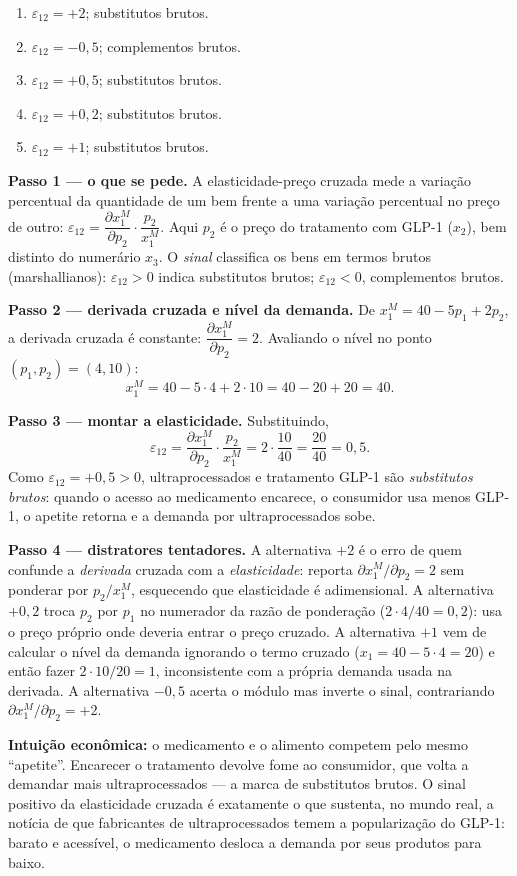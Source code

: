 \begin{enumerate}[label=\Alph*., leftmargin=3.2em, itemsep=0.15em, topsep=0.2em]
  \item $\varepsilon_{12}=+2$; substitutos brutos.
  \item $\varepsilon_{12}=-0{,}5$; complementos brutos.
  \item $\varepsilon_{12}=+0{,}5$; substitutos brutos.
  \item $\varepsilon_{12}=+0{,}2$; substitutos brutos.
  \item $\varepsilon_{12}=+1$; substitutos brutos.
\end{enumerate}
\begin{solucao}
\textbf{Passo 1 --- o que se pede.} A elasticidade-preço cruzada mede a variação percentual da quantidade de um bem frente a uma variação percentual no preço de outro: $\varepsilon_{12}=\dfrac{\partial x_1^{M}}{\partial p_2}\cdot\dfrac{p_2}{x_1^{M}}$. Aqui $p_2$ é o preço do tratamento com GLP-1 ($x_2$), bem distinto do numerário $x_3$. O \emph{sinal} classifica os bens em termos brutos (marshallianos): $\varepsilon_{12}>0$ indica substitutos brutos; $\varepsilon_{12}<0$, complementos brutos.

\textbf{Passo 2 --- derivada cruzada e nível da demanda.} De $x_1^{M}=40-5p_1+2p_2$, a derivada cruzada é constante: $\dfrac{\partial x_1^{M}}{\partial p_2}=2$. Avaliando o nível no ponto $(p_1,p_2)=(4,10)$:
\[
x_1^{M}=40-5\cdot 4+2\cdot 10=40-20+20=40.
\]

\textbf{Passo 3 --- montar a elasticidade.} Substituindo,
\[
\varepsilon_{12}=\frac{\partial x_1^{M}}{\partial p_2}\cdot\frac{p_2}{x_1^{M}}=2\cdot\frac{10}{40}=\frac{20}{40}=0{,}5.
\]
Como $\varepsilon_{12}=+0{,}5>0$, ultraprocessados e tratamento GLP-1 são \emph{substitutos brutos}: quando o acesso ao medicamento encarece, o consumidor usa menos GLP-1, o apetite retorna e a demanda por ultraprocessados sobe.

\textbf{Passo 4 --- distratores tentadores.} A alternativa $+2$ é o erro de quem confunde a \emph{derivada} cruzada com a \emph{elasticidade}: reporta $\partial x_1^{M}/\partial p_2=2$ sem ponderar por $p_2/x_1^{M}$, esquecendo que elasticidade é adimensional. A alternativa $+0{,}2$ troca $p_2$ por $p_1$ no numerador da razão de ponderação ($2\cdot 4/40=0{,}2$): usa o preço próprio onde deveria entrar o preço cruzado. A alternativa $+1$ vem de calcular o nível da demanda ignorando o termo cruzado ($x_1=40-5\cdot4=20$) e então fazer $2\cdot 10/20=1$, inconsistente com a própria demanda usada na derivada. A alternativa $-0{,}5$ acerta o módulo mas inverte o sinal, contrariando $\partial x_1^{M}/\partial p_2=+2$.

\textbf{Intuição econômica:} o medicamento e o alimento competem pelo mesmo ``apetite''. Encarecer o tratamento devolve fome ao consumidor, que volta a demandar mais ultraprocessados --- a marca de substitutos brutos. O sinal positivo da elasticidade cruzada é exatamente o que sustenta, no mundo real, a notícia de que fabricantes de ultraprocessados temem a popularização do GLP-1: barato e acessível, o medicamento desloca a demanda por seus produtos para baixo.
\end{solucao}

